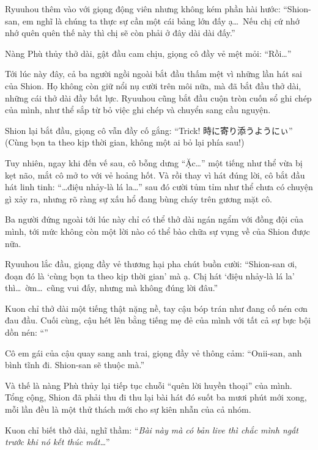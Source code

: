 \documentclass[../main.tex]{subfiles}
\begin{document}
Ryuuhou thêm vào với giọng động viên nhưng không kém phần hài hước: ``Shion-san, em nghĩ là chúng ta thực sự cần một cái bảng lớn đấy ạ\dots\ Nếu chị cứ nhớ nhớ quên quên thế này thì chị sẽ còn phải ở đây dài dài đấy.''

Nàng Phù thủy thở dài, gật đầu cam chịu, giọng cô đầy vẻ mệt mỏi: ``Rồi\dots''


Tới lúc này đây, cả ba người ngồi ngoài bắt đầu thấm mệt vì những lần hát sai của Shion. Họ không còn giữ nổi nụ cười trên môi nữa, mà đã bắt đầu thở dài, những cái thở dài đầy bất lực. Ryuuhou cũng bắt đầu cuộn tròn cuốn sổ ghi chép của mình, như thể sắp từ bỏ việc ghi chép và chuyển sang cầu nguyện.

Shion lại bắt đầu, giọng cô vẫn đầy cố gắng: ``{\fotskip Trick! 時に寄り添うようにぃ}'' (Cùng bọn ta theo kịp thời gian, không một ai bỏ lại phía sau!)

Tuy nhiên, ngay khi đến vế sau, cô bỗng dưng ``Ặc\dots'' một tiếng như thể vừa bị kẹt não, mắt cô mở to với vẻ hoảng hốt. Và rồi thay vì hát đúng lời, cô bắt đầu hát linh tinh: ``\dots điệu nhảy-là lá la\dots'' sau đó cười tủm tỉm như thể chưa có chuyện gì xảy ra, nhưng rõ ràng sự xấu hổ đang bùng cháy trên gương mặt cô.


Ba người đứng ngoài tới lúc này chỉ có thể thở dài ngán ngẩm với đồng đội của mình, tới mức không còn một lời nào có thể bào chữa sự vụng về của Shion được nữa.

Ryuuhou lắc đầu, giọng đầy vẻ thương hại pha chút buồn cười: ``Shion-san ơi, đoạn đó là `cùng bọn ta theo kịp thời gian' mà ạ. Chị hát `điệu nhảy-là lá la' thì\dots\ ờm\dots\ cũng vui đấy, nhưng mà không đúng lời đâu.''

Kuon chỉ thở dài một tiếng thật nặng nề, tay cậu bóp trán như đang cố nén cơn đau đầu. Cuối cùng, cậu hét lên bằng tiếng mẹ đẻ của mình với tất cả sự bực bội dồn nén: ``\textbf{}''

Cô em gái của cậu quay sang anh trai, giọng đầy vẻ thông cảm: ``Onii-san, anh bình tĩnh đi. Shion-san sẽ thuộc mà.''

Và thế là nàng Phù thủy lại tiếp tục chuỗi ``quên lời huyền thoại'' của mình. Tổng cộng, Shion đã phải thu đi thu lại bài hát đó suốt ba mươi phút mới xong, mỗi lần đều là một thử thách mới cho sự kiên nhẫn của cả nhóm.

Kuon chỉ biết thở dài, nghĩ thầm: ``\textit{Bài này mà có bản live thì chắc mình ngất trước khi nó kết thúc mất\dots}''
\end{document}
